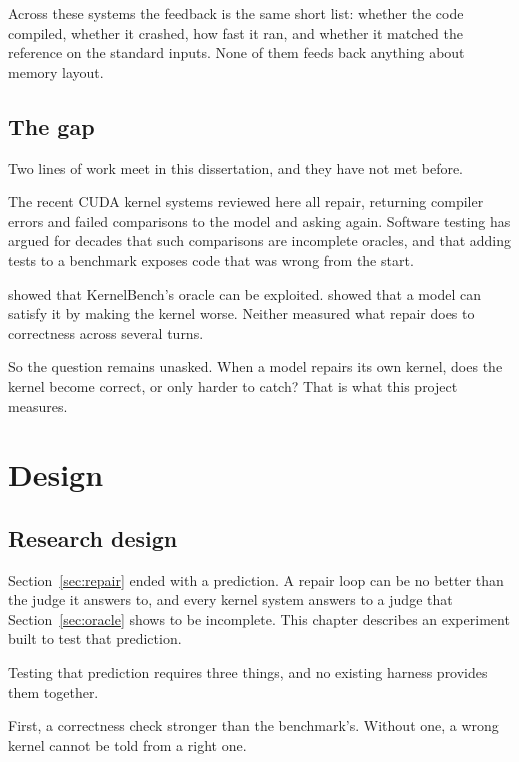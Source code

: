 \documentclass[12pt]{article}
\begin{document}
Across these systems the feedback is the same short list: whether the code
compiled, whether it crashed, how fast it ran, and whether it matched the
reference on the standard inputs. None of them feeds back anything about memory
layout.

\subsection{The gap}
\label{sec:gap}

Two lines of work meet in this dissertation, and they have not met before.

The recent CUDA kernel systems reviewed here all repair, returning compiler
errors and failed comparisons to the model and asking again. Software testing has argued for
decades that such comparisons are incomplete oracles, and that adding tests to
a benchmark exposes code that was wrong from the start.

\citet{lange2025robustkbench} showed that KernelBench's oracle can be
exploited. \citet{li2026cudabeaver} showed that a model can satisfy it by
making the kernel worse. Neither measured what repair does to correctness
across several turns.

So the question remains unasked. When a model repairs its own kernel, does the
kernel become correct, or only harder to catch? That is what this project
measures.

\section{Design}

\subsection{Research design}

Section~\ref{sec:repair} ended with a prediction. A repair loop can be no
better than the judge it answers to, and every kernel system answers to a judge
that Section~\ref{sec:oracle} shows to be incomplete. This chapter describes an
experiment built to test that prediction.

Testing that prediction requires three things, and no existing harness provides
them together.

First, a correctness check stronger than the benchmark's. Without one, a wrong
kernel cannot be told from a right one.
\end{document}
